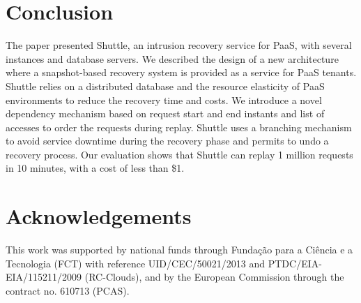 
\section{Conclusion}
\label{sec:conclusion}
The paper presented Shuttle, an intrusion recovery service for PaaS, with several instances and database servers. We described the design of a new architecture where a snapshot-based recovery system is provided as a service for PaaS tenants. Shuttle relies on a distributed database and the resource elasticity of PaaS environments to reduce the recovery time and costs. We introduce a novel dependency mechanism based on request start and end instants and list of accesses to order the requests during replay. 
Shuttle uses a branching mechanism to avoid service downtime during the recovery phase and permits to undo a recovery process.  
Our evaluation shows that Shuttle can replay 1 million requests in 10 minutes, with a cost of less than \$1. 



\section{Acknowledgements}
This work was supported by national funds through Funda\c{c}\~ao para a Ci\^encia e a Tecnologia (FCT) with reference UID/CEC/50021/2013 and PTDC/EIA- EIA/115211/2009 (RC-Clouds), and by the  European Commission through the contract no. 610713 (PCAS).